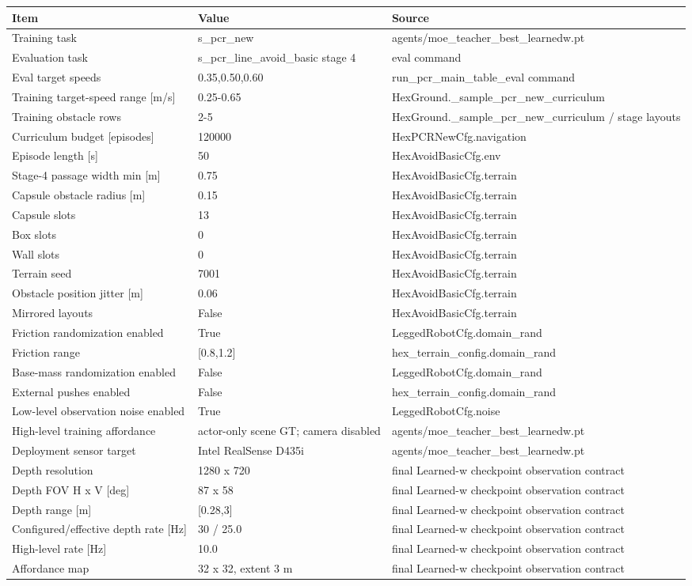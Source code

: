 \begin{tabular}{lll}
\toprule
Item & Value & Source \\
\midrule
Training task & s\_pcr\_new & agents/moe\_teacher\_best\_learnedw.pt \\
Evaluation task & s\_pcr\_line\_avoid\_basic stage 4 & eval command \\
Eval target speeds & 0.35,0.50,0.60 & run\_pcr\_main\_table\_eval command \\
Training target-speed range [m/s] & 0.25-0.65 & HexGround.\_sample\_pcr\_new\_curriculum \\
Training obstacle rows & 2-5 & HexGround.\_sample\_pcr\_new\_curriculum / stage layouts \\
Curriculum budget [episodes] & 120000 & HexPCRNewCfg.navigation \\
Episode length [s] & 50 & HexAvoidBasicCfg.env \\
Stage-4 passage width min [m] & 0.75 & HexAvoidBasicCfg.terrain \\
Capsule obstacle radius [m] & 0.15 & HexAvoidBasicCfg.terrain \\
Capsule slots & 13 & HexAvoidBasicCfg.terrain \\
Box slots & 0 & HexAvoidBasicCfg.terrain \\
Wall slots & 0 & HexAvoidBasicCfg.terrain \\
Terrain seed & 7001 & HexAvoidBasicCfg.terrain \\
Obstacle position jitter [m] & 0.06 & HexAvoidBasicCfg.terrain \\
Mirrored layouts & False & HexAvoidBasicCfg.terrain \\
Friction randomization enabled & True & LeggedRobotCfg.domain\_rand \\
Friction range & [0.8,1.2] & hex\_terrain\_config.domain\_rand \\
Base-mass randomization enabled & False & LeggedRobotCfg.domain\_rand \\
External pushes enabled & False & hex\_terrain\_config.domain\_rand \\
Low-level observation noise enabled & True & LeggedRobotCfg.noise \\
High-level training affordance & actor-only scene GT; camera disabled & agents/moe\_teacher\_best\_learnedw.pt \\
Deployment sensor target & Intel RealSense D435i & agents/moe\_teacher\_best\_learnedw.pt \\
Depth resolution & 1280 x 720 & final Learned-w checkpoint observation contract \\
Depth FOV H x V [deg] & 87 x 58 & final Learned-w checkpoint observation contract \\
Depth range [m] & [0.28,3] & final Learned-w checkpoint observation contract \\
Configured/effective depth rate [Hz] & 30 / 25.0 & final Learned-w checkpoint observation contract \\
High-level rate [Hz] & 10.0 & final Learned-w checkpoint observation contract \\
Affordance map & 32 x 32, extent 3 m & final Learned-w checkpoint observation contract \\
\bottomrule
\end{tabular}
